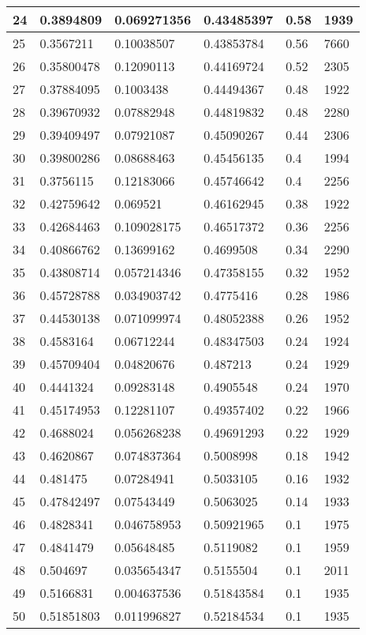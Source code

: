 \begin{longtable}{|l|l|l|l|l|l|}
24 & 0.3894809 & 0.069271356 & 0.43485397 & 0.58 & 1939 \\ \hline 
25 & 0.3567211 & 0.10038507 & 0.43853784 & 0.56 & 7660 \\ \hline 
26 & 0.35800478 & 0.12090113 & 0.44169724 & 0.52 & 2305 \\ \hline 
27 & 0.37884095 & 0.1003438 & 0.44494367 & 0.48 & 1922 \\ \hline 
28 & 0.39670932 & 0.07882948 & 0.44819832 & 0.48 & 2280 \\ \hline 
29 & 0.39409497 & 0.07921087 & 0.45090267 & 0.44 & 2306 \\ \hline 
30 & 0.39800286 & 0.08688463 & 0.45456135 & 0.4 & 1994 \\ \hline 
31 & 0.3756115 & 0.12183066 & 0.45746642 & 0.4 & 2256 \\ \hline 
32 & 0.42759642 & 0.069521 & 0.46162945 & 0.38 & 1922 \\ \hline 
33 & 0.42684463 & 0.109028175 & 0.46517372 & 0.36 & 2256 \\ \hline 
34 & 0.40866762 & 0.13699162 & 0.4699508 & 0.34 & 2290 \\ \hline 
35 & 0.43808714 & 0.057214346 & 0.47358155 & 0.32 & 1952 \\ \hline 
36 & 0.45728788 & 0.034903742 & 0.4775416 & 0.28 & 1986 \\ \hline 
37 & 0.44530138 & 0.071099974 & 0.48052388 & 0.26 & 1952 \\ \hline 
38 & 0.4583164 & 0.06712244 & 0.48347503 & 0.24 & 1924 \\ \hline 
39 & 0.45709404 & 0.04820676 & 0.487213 & 0.24 & 1929 \\ \hline 
40 & 0.4441324 & 0.09283148 & 0.4905548 & 0.24 & 1970 \\ \hline 
41 & 0.45174953 & 0.12281107 & 0.49357402 & 0.22 & 1966 \\ \hline 
42 & 0.4688024 & 0.056268238 & 0.49691293 & 0.22 & 1929 \\ \hline 
43 & 0.4620867 & 0.074837364 & 0.5008998 & 0.18 & 1942 \\ \hline 
44 & 0.481475 & 0.07284941 & 0.5033105 & 0.16 & 1932 \\ \hline 
45 & 0.47842497 & 0.07543449 & 0.5063025 & 0.14 & 1933 \\ \hline 
46 & 0.4828341 & 0.046758953 & 0.50921965 & 0.1 & 1975 \\ \hline 
47 & 0.4841479 & 0.05648485 & 0.5119082 & 0.1 & 1959 \\ \hline 
48 & 0.504697 & 0.035654347 & 0.5155504 & 0.1 & 2011 \\ \hline 
49 & 0.5166831 & 0.004637536 & 0.51843584 & 0.1 & 1935 \\ \hline 
50 & 0.51851803 & 0.011996827 & 0.52184534 & 0.1 & 1935 \\ \hline 
\end{longtable}